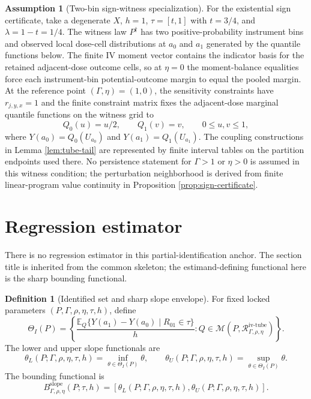 \documentclass[11pt]{article}
\newcommand{\E}{\mathbb{E}}
\theoremstyle{definition}
\newtheorem{definition}{Definition}
\newtheorem{assumption}{Assumption}
\theoremstyle{plain}
\theoremstyle{remark}
\begin{document}
\begin{assumption}[Two-bin sign-witness specialization]\label{ass:witness}
For the existential sign certificate, take a degenerate \(X\), \(h=1\), \(\tau=[t,1]\) with \(t=3/4\), and \(\lambda=1-t=1/4\).  The witness law \(P^\dagger\) has two positive-probability instrument bins and observed local dose-cell distributions at \(a_0\) and \(a_1\) generated by the quantile functions below.  The finite IV moment vector contains the indicator basis for the retained adjacent-dose outcome cells, so at \(\eta=0\) the moment-balance equalities force each instrument-bin potential-outcome margin to equal the pooled margin.  At the reference point \((\Gamma,\eta)=(1,0)\), the sensitivity constraints have \(r_{j,y,x}=1\) and the finite constraint matrix fixes the adjacent-dose marginal quantile functions on the witness grid to
\[
Q_0(u)=u/2,\qquad Q_1(v)=v,\qquad 0\le u,v\le1,
\]
where \(Y(a_0)=Q_0(U_{a_0})\) and \(Y(a_1)=Q_1(U_{a_1})\).  The coupling constructions in Lemma \ref{lem:tube-tail} are represented by finite interval tables on the partition endpoints used there.  No persistence statement for \(\Gamma>1\) or \(\eta>0\) is assumed in this witness condition; the perturbation neighborhood is derived from finite linear-program value continuity in Proposition \ref{prop:sign-certificate}.
\end{assumption}

\section{Regression estimator}
There is no regression estimator in this partial-identification anchor.  The section title is inherited from the common skeleton; the estimand-defining functional here is the sharp bounding functional.

\begin{definition}[Identified set and sharp slope envelope]\label{def:sharp-envelope}
For fixed locked parameters \((P,\Gamma,\rho,\eta,\tau,h)\), define
\[
\Theta_I(P)=
\left\{
\frac{\E_Q\{Y(a_1)-Y(a_0)\mid R_{01}\in\tau\}}{h}:
Q\in\mathcal M(P,\mathcal R_{\Gamma,\rho,\eta}^{\mathrm{iv\text{-}tube}})
\right\}.
\]
The lower and upper slope functionals are
\[
\theta_L(P;\Gamma,\rho,\eta,\tau,h)
=\inf_{\theta\in\Theta_I(P)}\theta,
\qquad
\theta_U(P;\Gamma,\rho,\eta,\tau,h)
=\sup_{\theta\in\Theta_I(P)}\theta.
\]
The bounding functional is
\[
B_{\Gamma,\rho,\eta}^{\mathrm{slope}}(P;\tau,h)
=
\left[
\theta_L(P;\Gamma,\rho,\eta,\tau,h),
\theta_U(P;\Gamma,\rho,\eta,\tau,h)
\right].
\]
\end{definition}
\end{document}
